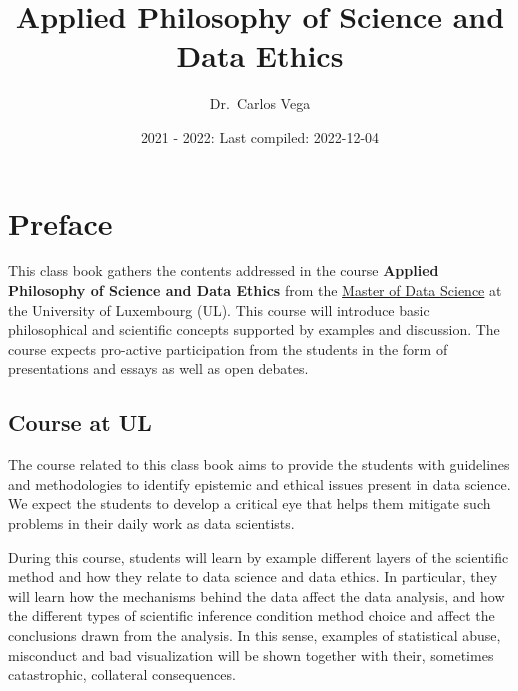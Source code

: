 \documentclass[
]{book}
\title{Applied Philosophy of Science and Data Ethics}
\author{Dr.~Carlos Vega}
\date{2021 - 2022: Last compiled: 2022-12-04}
\let\oldmaketitle\maketitle
\begin{document}
\maketitle

\thispagestyle{empty}


\let\maketitle\oldmaketitle
\maketitle

{
\hypersetup{linkcolor=}
\setcounter{tocdepth}{3}
\tableofcontents
}
\hypertarget{preface}{%
\chapter*{Preface}\label{preface}}

This class book gathers the contents addressed in the course \textbf{Applied Philosophy of Science and Data Ethics} from the \href{https://wwwfr.uni.lu/formations/fstm/master_of_data_science}{Master of Data Science} at the University of Luxembourg (UL). This course will introduce basic philosophical and scientific concepts supported by examples and discussion. The course expects pro-active participation from the students in the form of presentations and essays as well as open debates.

\hypertarget{course-at-ul}{%
\section*{Course at UL}\label{course-at-ul}}

The course related to this class book aims to provide the students with guidelines and methodologies to identify epistemic and ethical issues present in data science. We expect the students to develop a critical eye that helps them mitigate such problems in their daily work as data scientists.

During this course, students will learn by example different layers of the scientific method and how they relate to data science and data ethics. In particular, they will learn how the mechanisms behind the data affect the data analysis, and how the different types of scientific inference condition method choice and affect the conclusions drawn from the analysis. In this sense, examples of statistical abuse, misconduct and bad visualization will be shown together with their, sometimes catastrophic, collateral consequences.
\end{document}
